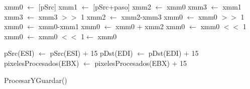 \documentclass[11pt, a4paper]{article}
\begin{document}
   \begin{algorithm}[H]
     \SetLine
    	xmm0 $\leftarrow$ [pSrc]\;
			xmm1 $\leftarrow$ [pSrc+paso]\;
			xmm2 $\leftarrow$ xmm0\;
			xmm3 $\leftarrow$ xmm1\;
			xmm3 $\leftarrow$ xmm3 $>>$ 1\;
			xmm2 $\leftarrow$ xmm2-xmm3\;
			xmm0 $\leftarrow$ xmm0 $>>$ 1\;
			xmm0 $\leftarrow$ xmm0-xmm1\;
			xmm0 $\leftarrow$ xmm0 + xmm2\;
			xmm0 $\leftarrow$ xmm0 $<<$ 1\;
			xmm0 $\leftarrow$ xmm0 $<<$ 1 $\leftarrow$ xmm0\;
     

			pSrc(ESI) $\leftarrow$ pSrc(ESI) $+$ 15 \;
			pDst(EDI) $\leftarrow$ pDst(EDI) $+$ 15\;
	    pixelesProcesados(EBX) $\leftarrow$ pixelesProcesados(EBX) + 15\;
     
     \caption{ProcesarYGuardar()}
   \end{algorithm}































 
    \incmargin{1em}
    \linesnumbered
    \dontprintsemicolon
    
\end{document}
